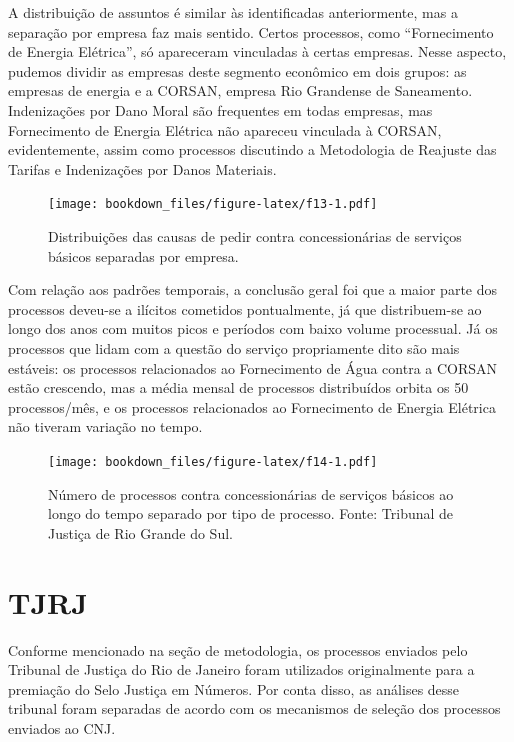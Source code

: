 \documentclass[]{report}
\begin{document}
A distribuição de assuntos é similar às identificadas anteriormente, mas
a separação por empresa faz mais sentido. Certos processos, como
``Fornecimento de Energia Elétrica'', só apareceram vinculadas à certas
empresas. Nesse aspecto, pudemos dividir as empresas deste segmento
econômico em dois grupos: as empresas de energia e a CORSAN, empresa Rio
Grandense de Saneamento. Indenizações por Dano Moral são frequentes em
todas empresas, mas Fornecimento de Energia Elétrica não apareceu
vinculada à CORSAN, evidentemente, assim como processos discutindo a
Metodologia de Reajuste das Tarifas e Indenizações por Danos Materiais.

\begin{figure}[htbp]
\centering
\texttt{[image: bookdown\_files/figure-latex/f13-1.pdf]}
\caption{\label{fig:f13}Distribuições das causas de pedir contra
concessionárias de serviços básicos separadas por empresa.}
\end{figure}

Com relação aos padrões temporais, a conclusão geral foi que a maior
parte dos processos deveu-se a ilícitos cometidos pontualmente, já que
distribuem-se ao longo dos anos com muitos picos e períodos com baixo
volume processual. Já os processos que lidam com a questão do serviço
propriamente dito são mais estáveis: os processos relacionados ao
Fornecimento de Água contra a CORSAN estão crescendo, mas a média mensal
de processos distribuídos orbita os 50 processos/mês, e os processos
relacionados ao Fornecimento de Energia Elétrica não tiveram variação no
tempo.

\begin{figure}[htbp]
\centering
\texttt{[image: bookdown\_files/figure-latex/f14-1.pdf]}
\caption{\label{fig:f14}Número de processos contra concessionárias de
serviços básicos ao longo do tempo separado por tipo de processo. Fonte:
Tribunal de Justiça de Rio Grande do Sul.}
\end{figure}

\section{TJRJ}\label{tjrj}

Conforme mencionado na seção de metodologia, os processos enviados pelo
Tribunal de Justiça do Rio de Janeiro foram utilizados originalmente
para a premiação do Selo Justiça em Números. Por conta disso, as
análises desse tribunal foram separadas de acordo com os mecanismos de
seleção dos processos enviados ao CNJ.
\end{document}
